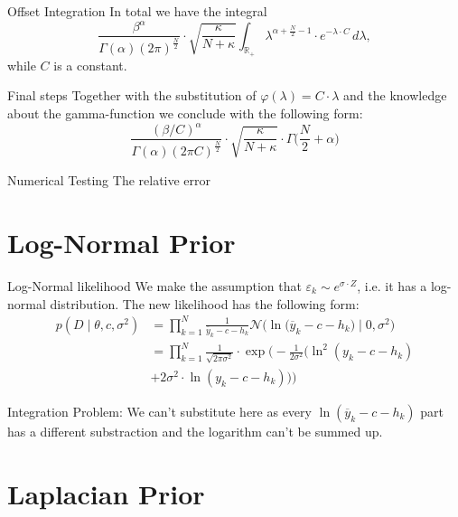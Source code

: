 \documentclass{beamer}
\newcommand{\s}{\sigma^2}
\newcommand{\y}{\overline{y}}
\newcommand{\R}{\mathbb{R}}
\begin{document}
  	\begin{frame}{Offset Integration}
  		In total we have the integral
  			\[
  				\frac{\beta^\alpha}{\Gamma(\alpha) (2\pi)^{\frac{N}{2}}} \cdot 						\sqrt{\frac{\kappa}{N + \kappa}} \int_{\R_+} \lambda^{\alpha + 						\frac{N}{2} - 1} \cdot e^{-\lambda \cdot C} \, d\lambda,
  			\]
  		while $C$ is a constant.
  	\end{frame}
  	
  	\begin{frame}{Final steps}
  		Together with the substitution of $\varphi (\lambda) = C \cdot \lambda$ 			and the knowledge about the gamma-function we conclude with the following 			form:
  		\[
  			\frac{(\beta / C)^\alpha}{\Gamma(\alpha) (2\pi C)^{\frac{N}{2}}} \cdot 			\sqrt{\frac{\kappa}{N + \kappa}} \cdot \Gamma \biggl(\frac{N}{2} + 					\alpha \biggr)
  		\]
   	\end{frame}
   	
   	\begin{frame}{Numerical Testing}
   		The relative error
   	\end{frame}
   	
\section{Log-Normal Prior}

	\begin{frame}{Log-Normal likelihood}
		We make the assumption that $\varepsilon_k \sim e^{\sigma \cdot Z}$, i.e. 			it has a  log-normal distribution. The new likelihood has the following 			form:
		\begin{align}
			p(D \mid \theta, c, \sigma^2) &= \prod_{k = 1}^N \frac{1}{\y_k - c 					- h_k}\mathcal{N}\bigl( \ln\bigl(\y_k - c - h_k\bigr) \mid 0, \s\bigr) 			\\
			&= \prod_{k = 1}^N \frac{1}{\sqrt{2\pi\s}} \cdot \exp\biggl(-\frac{1}				{2\s}\bigl(\ln^2(y_k - c - h_k) \\
			& + 2\s \cdot \ln(y_k - c - h_k)\bigr)\biggr)
		\end{align}
	\end{frame}

	\begin{frame}{Integration}
		Problem: We can't substitute here as every $\ln(\y_k - c - h_k)$ part has 			a different substraction and the logarithm can't be summed up.
	\end{frame}

\section{Laplacian Prior}
\end{document}
